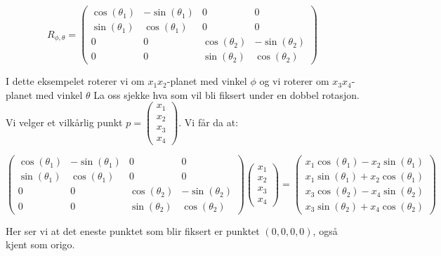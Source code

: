 \documentclass[a4paper,10pt,english]{article}
\begin{document}
    $$
    R_{\phi, \theta} = \left(
    \begin{matrix}
        \cos(\theta_{1}) & -\sin(\theta_{1}) & 0 & 0 \\
        \sin(\theta_{1}) &  \cos(\theta_{1}) & 0 & 0 \\
        0 & 0 & \cos(\theta_{2}) & -\sin(\theta_{2}) \\
        0 & 0 & \sin(\theta_{2}) &  \cos(\theta_{2})
    \end{matrix}
    \right)
    $$

    I dette eksempelet roterer vi om $x_{1}x_{2}$-planet med vinkel $\phi$ og vi roterer om $x_{3}x_{4}$-planet med vinkel $\theta$
    La oss sjekke hva som vil bli fiksert under en dobbel rotasjon. Vi velger et vilkårlig punkt $p = \left( \begin{smallmatrix} x_{1} \\ x_{2} \\ x_{3} \\ x_{4} \end{smallmatrix} \right)$. Vi får da at:

    $$
    \left(
    \begin{matrix}
        \cos(\theta_{1}) & -\sin(\theta_{1}) & 0 & 0 \\
        \sin(\theta_{1}) &  \cos(\theta_{1}) & 0 & 0 \\
        0 & 0 & \cos(\theta_{2}) & -\sin(\theta_{2}) \\
        0 & 0 & \sin(\theta_{2}) &  \cos(\theta_{2})
    \end{matrix}
    \right)
    \left(
    \begin{matrix}
        x_{1} \\ x_{2} \\ x_{3} \\ x_{4}
    \end{matrix}
    \right) = 
    \left(
    \begin{matrix}
        x_{1}\cos(\theta_{1}) - x_{2}\sin(\theta_{1}) \\
        x_{1}\sin(\theta_{1}) + x_{2}\cos(\theta_{1}) \\
        x_{3}\cos(\theta_{2}) - x_{4}\sin(\theta_{2}) \\
        x_{3}\sin(\theta_{2}) + x_{4}\cos(\theta_{2})
    \end{matrix}
    \right)
    $$

    Her ser vi at det eneste punktet som blir fiksert er punktet $\left( 0, 0, 0, 0 \right)$, også kjent som origo.
\end{document}
